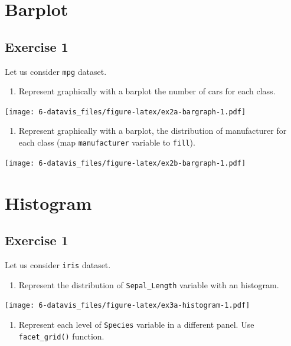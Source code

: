 \documentclass[]{book}
\providecommand{\tightlist}{%
  \setlength{\itemsep}{0pt}\setlength{\parskip}{0pt}}
\def\tightlist{}
\begin{document}
\section{Barplot}\label{barplot}

\subsection{Exercise 1}\label{exercise-1-14}

Let us consider \texttt{mpg} dataset.

\begin{enumerate}
\def\labelenumi{\alph{enumi}.}
\tightlist
\item
  Represent graphically with a barplot the number of cars for each
  class.
\end{enumerate}

\texttt{[image: 6-datavis\_files/figure-latex/ex2a-bargraph-1.pdf]}

\begin{enumerate}
\def\labelenumi{\alph{enumi}.}
\setcounter{enumi}{1}
\tightlist
\item
  Represent graphically with a barplot, the distribution of manufacturer
  for each class (map \texttt{manufacturer} variable to \texttt{fill}).
\end{enumerate}

\texttt{[image: 6-datavis\_files/figure-latex/ex2b-bargraph-1.pdf]}

\clearpage

\section{Histogram}\label{histogram}

\subsection{Exercise 1}\label{exercise-1-15}

Let us consider \texttt{iris} dataset.

\begin{enumerate}
\def\labelenumi{\alph{enumi}.}
\tightlist
\item
  Represent the distribution of \texttt{Sepal\_Length} variable with an
  histogram.
\end{enumerate}

\texttt{[image: 6-datavis\_files/figure-latex/ex3a-histogram-1.pdf]}

\begin{enumerate}
\def\labelenumi{\alph{enumi}.}
\setcounter{enumi}{1}
\tightlist
\item
  Represent each level of \texttt{Species} variable in a different
  panel. Use \texttt{facet\_grid()} function.
\end{enumerate}
\end{document}
